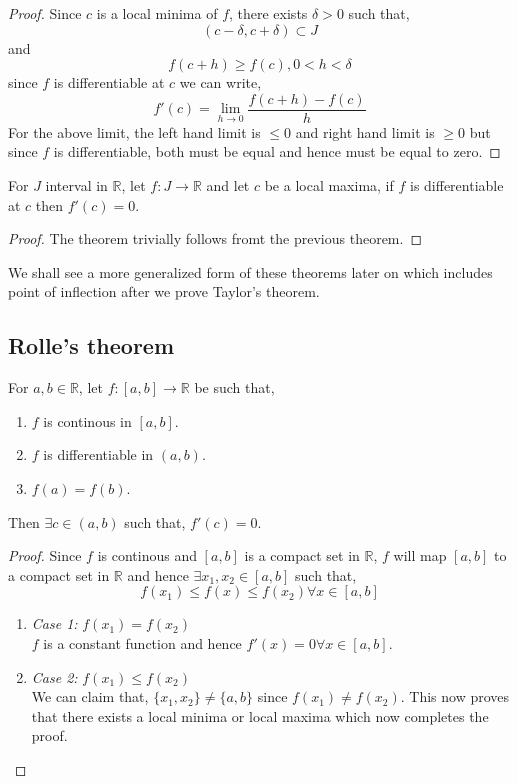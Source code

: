 \documentclass[11pt,a4paper]{colorart}
\def\d{{\delta}}
\def\R{\mathbb{R}}
\def\ra{\rightarrow}
\begin{document}
\begin{proof}
	Since $c$ is a local minima of $f$, there exists $\d >0$ such that,
	\[ (c-\d,c+\d) \subset J \]
	and
	\[ f(c+h) \geq f(c), 0<h<\d \]
	since $f$ is differentiable at $c$ we can write,
	\[ f'(c) =  \lim_{ h \to 0 } \frac{ f(c+h) - f(c) }{ h } \]
	For the above limit, the left hand limit is $\leq 0$ and right hand limit is $\geq 0$ but since $f$ is differentiable, both must be equal and hence must be equal to zero.
\end{proof}

\begin{theorem}
	For $J$ interval in $\R$, let $f:J\ra\R$ and let $c$ be a local maxima, if $f$ is differentiable at $c$ then $f'(c)=0$.
\end{theorem}

\begin{proof}
	The theorem trivially follows fromt the previous theorem.
\end{proof}

We shall see a more generalized form of these theorems later on which includes point of inflection after we prove Taylor's theorem.

\subsection{Rolle's theorem}

\begin{theorem}
	For $a,b \in \R$, let $f:[a,b] \ra \R$ be such that,
	\begin{enumerate}
		\item $f$ is continous in $[a,b]$.
		\item $f$ is differentiable in $(a,b)$.
		\item $f(a)=f(b)$.
	\end{enumerate}
	Then $\exists c \in (a,b)$ such that, $f'(c) = 0$.
\end{theorem}

\begin{proof}
	Since $f$ is continous and $[a,b]$ is a compact set in $\R$, $f$ will map $[a,b]$ to a compact set in $\R$ and hence $\exists x_1,x_2 \in [a,b]$ such that,
	\[ f(x_1) \leq f(x) \leq f(x_2) \forall x \in [a,b] \]

	\begin{enumerate}
		\item \textit{Case 1:} $f(x_1) = f(x_2) $\\
			$f$ is a constant function and hence $f'(x) = 0 \forall x \in [a,b]$.
		\item \textit{Case 2:} $f(x_1) \leq f(x_2)$\\
			We can claim that, $\{x_1,x_2\} \neq \{a,b\}$ since $f(x_1)\neq f(x_2)$. This now proves that there exists a local minima or local maxima which now completes the proof.
	\end{enumerate}
\end{proof}
\end{document}
